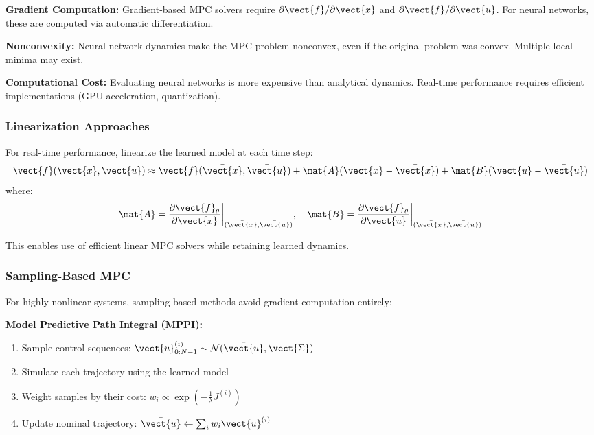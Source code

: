 \textbf{Gradient Computation:} Gradient-based MPC solvers require $\partial \vect{f} / \partial \vect{x}$ and $\partial \vect{f} / \partial \vect{u}$. For neural networks, these are computed via automatic differentiation.

\textbf{Nonconvexity:} Neural network dynamics make the MPC problem nonconvex, even if the original problem was convex. Multiple local minima may exist.

\textbf{Computational Cost:} Evaluating neural networks is more expensive than analytical dynamics. Real-time performance requires efficient implementations (GPU acceleration, quantization).

\subsubsection{Linearization Approaches}

For real-time performance, linearize the learned model at each time step:
\begin{equation}
\vect{f}(\vect{x}, \vect{u}) \approx \vect{f}(\bar{\vect{x}}, \bar{\vect{u}}) + \mat{A}(\vect{x} - \bar{\vect{x}}) + \mat{B}(\vect{u} - \bar{\vect{u}})
\label{eq:linearized_model}
\end{equation}
where:
\begin{equation}
\mat{A} = \frac{\partial \vect{f}_\theta}{\partial \vect{x}}\bigg|_{(\bar{\vect{x}}, \bar{\vect{u}})}, \quad \mat{B} = \frac{\partial \vect{f}_\theta}{\partial \vect{u}}\bigg|_{(\bar{\vect{x}}, \bar{\vect{u}})}
\end{equation}

This enables use of efficient linear MPC solvers while retaining learned dynamics.

\subsubsection{Sampling-Based MPC}

For highly nonlinear systems, sampling-based methods avoid gradient computation entirely:

\textbf{Model Predictive Path Integral (MPPI):}
\begin{enumerate}
    \item Sample control sequences: $\vect{u}_{0:N-1}^{(i)} \sim \mathcal{N}(\bar{\vect{u}}, \vect{\Sigma})$
    \item Simulate each trajectory using the learned model
    \item Weight samples by their cost: $w_i \propto \exp(-\frac{1}{\lambda}J^{(i)})$
    \item Update nominal trajectory: $\bar{\vect{u}} \leftarrow \sum_i w_i \vect{u}^{(i)}$
\end{enumerate}


